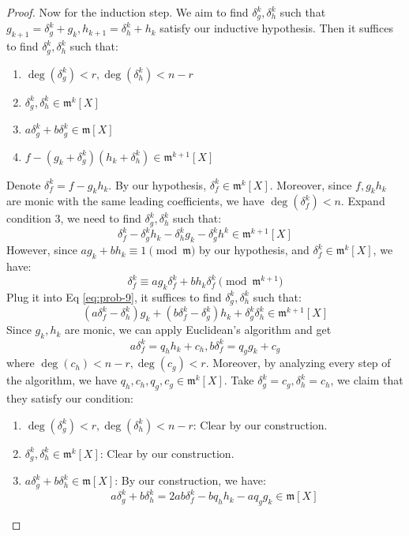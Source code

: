 \documentclass{solution}
\begin{document}
\begin{proof}
    Now for the induction step. We aim to find $\delta^k_g, \delta^k_h$ such that $g_{k + 1} = \delta^k_g + g_k, h_{k + 1} = \delta^k_h + h_k$ satisfy our inductive hypothesis. Then it suffices to find $\delta_g^k, \delta_h^k$ such that:
    \begin{enumerate}
        \item $\deg(\delta_g^k) \lt r, \deg(\delta_h^k) \lt n - r$
        \item $\delta_g^k, \delta_h^k \in \mathfrak{m}^k[X]$
        \item $a \delta_g^k + b \delta_g^k \in \mathfrak{m}[X]$
        \item $f - (g_k + \delta^k_g)(h_k + \delta^k_h) \in \mathfrak{m}^{k + 1}[X]$
    \end{enumerate}
    Denote $\delta_f^k = f - g_k h_k$. By our hypothesis, $\delta_f^k \in \mathfrak{m}^{k}[X]$. Moreover, since $f, g_k h_k$ are monic with the same leading coefficients, we have $\deg(\delta_f^k) \lt n$. Expand condition 3, we need to find $\delta_g^k, \delta_h^k$ such that:
    \begin{equation} \label{eq:prob-9}
        \delta_f^k - \delta_g^k h_k - \delta_h^k g_k - \delta_g^kh^k \in \mathfrak{m}^{k + 1}[X]
    \end{equation}
    However, since $ag_k + bh_k \equiv 1 \pmod {\mathfrak{m}}$ by our hypothesis, and $\delta_f^k \in \mathfrak{m}^{k}[X]$, we have:
    $$\delta_f^k \equiv a g_k\delta_f^k + bh_k \delta_f^k \pmod {\mathfrak{m}^{k + 1}}$$
    Plug it into Eq \ref{eq:prob-9}, it suffices to find $\delta_g^k, \delta_h^k$ such that:
    $$(a \delta_f^k - \delta_h^k) g_k + (b \delta_f^k - \delta_g^k) h_k + \delta_g^k \delta_h^k \in \mathfrak{m}^{k + 1}[X]$$
    Since $g_k, h_k$ are monic, we can apply Euclidean's algorithm and get
    $$a \delta_f^k = q_h h_k + c_h, b \delta_f^k = q_g g_k + c_g$$
    where $\deg(c_h) \lt n - r, \deg(c_g) \lt r$. Moreover, by analyzing every step of the algorithm, we have $q_h, c_h, q_g, c_g \in \mathfrak{m}^k[X]$. Take $\delta_g^k = c_g, \delta_h^k = c_h$, we claim that they satisfy our condition:
    \begin{enumerate}
        \item $\deg(\delta_g^k) \lt r, \deg(\delta_h^k) \lt n - r$: Clear by our construction.
        \item $\delta_g^k, \delta_h^k \in \mathfrak{m}^k[X]$: Clear by our construction.
        \item $a \delta_g^k + b \delta_h^k \in \mathfrak{m}[X]$: By our construction, we have:
        $$a \delta_g^k + b \delta_h^k = 2ab \delta_f^k - bq_h h_k - aq_g g_k \in \mathfrak{m}[X]$$

\end{enumerate}
\end{proof}
\end{document}
